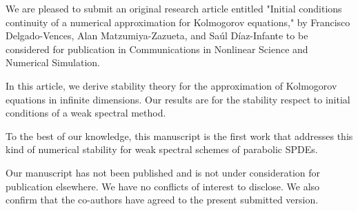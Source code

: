 \documentclass[10pt ,stdletter, dateno, sigleft]{newlfm}
\begin{document}
    \begin{newlfm}
    
             We are pleased to submit an original research article entitled
        "Initial conditions continuity of a numerical approximation for 
        Kolmogorov equations," by Francisco Delgado-Vences, Alan 
        Matzumiya-Zazueta, and Sa\'ul D\'iaz-Infante to be considered for 
        publication in Communications in Nonlinear Science and Numerical 
        Simulation.

            In this article, we derive stability theory for the
        approximation of Kolmogorov equations in infinite dimensions. Our
        results are for the stability respect to initial conditions of a weak
        spectral method.

            To the best of our knowledge, this manuscript is the first work 
        that addresses this kind of numerical stability for weak spectral 
        schemes of parabolic SPDEs.
    
            Our manuscript has not been published and is not under consideration
        for publication elsewhere. We have no conflicts of interest to disclose.
        We also confirm that the co-authors have agreed to the present 
        submitted version.
        \\[0.25cm]
\end{newlfm}
\end{document}
